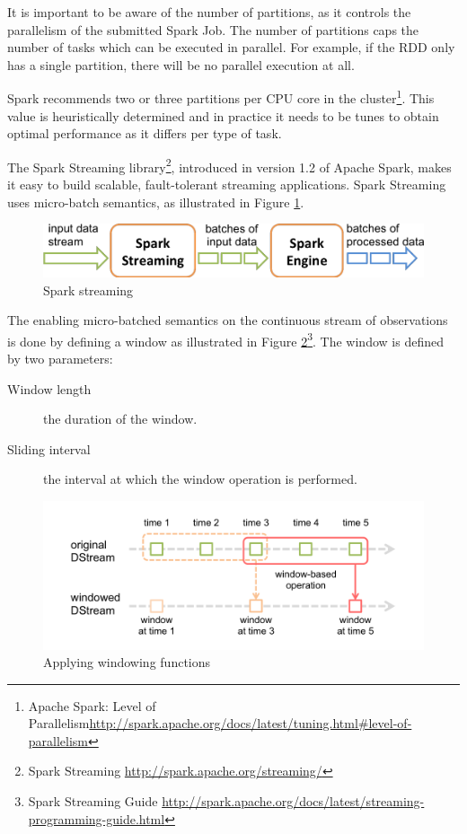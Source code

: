 It is important to be aware of the number of partitions, as it controls the parallelism of the submitted Spark Job. The number of partitions caps the number of tasks which can be executed in parallel. For example, if the RDD only has a single partition, there will be no parallel execution at all.

Spark recommends two or three partitions per CPU core in the cluster\footnote{Apache Spark: Level of Parallelism\url{http://spark.apache.org/docs/latest/tuning.html\#level-of-parallelism}}. This value is heuristically determined and in practice it needs to be tunes to obtain optimal performance as it differs per type of task.

The Spark Streaming library\footnote{Spark Streaming \url{http://spark.apache.org/streaming/}}, introduced in version 1.2 of Apache Spark, makes it easy to build scalable, fault-tolerant streaming applications. Spark Streaming uses micro-batch semantics, as illustrated in Figure \ref{fig:streaming}.

\begin{figure}[ht!]
\centering
\includegraphics[width=.9\textwidth]{figures/flow.png}
\caption{Spark streaming \label{fig:streaming}}
\end{figure}

The enabling micro-batched semantics on the continuous stream of observations is done by defining a window as illustrated in Figure \ref{fig:streamingWindow}\footnote{Spark Streaming Guide \url{http://spark.apache.org/docs/latest/streaming-programming-guide.html}}. The window is defined by two parameters:
\begin{description}
  \item[Window length] the duration of the window.
  \item[Sliding interval] the interval at which the window operation is performed.
\end{description}

\begin{figure}[ht!]
\centering
\includegraphics[width=.9\textwidth]{figures/window.png}
\caption{Applying windowing functions \label{fig:streamingWindow}}
\end{figure}

